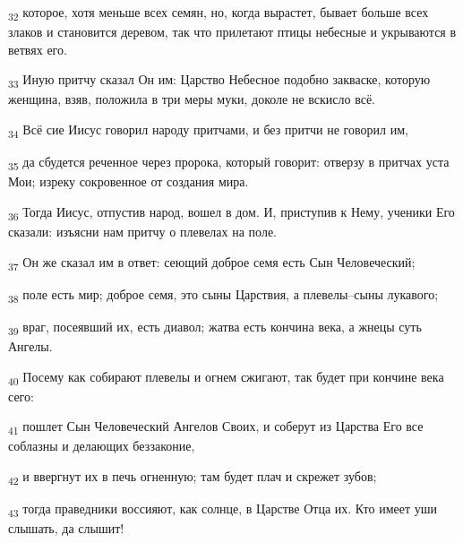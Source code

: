 \begin{tcolorbox}
\textsubscript{32} которое, хотя меньше всех семян, но, когда вырастет, бывает больше всех злаков и становится деревом, так что прилетают птицы небесные и укрываются в ветвях его.
\end{tcolorbox}
\begin{tcolorbox}
\textsubscript{33} Иную притчу сказал Он им: Царство Небесное подобно закваске, которую женщина, взяв, положила в три меры муки, доколе не вскисло всё.
\end{tcolorbox}
\begin{tcolorbox}
\textsubscript{34} Всё сие Иисус говорил народу притчами, и без притчи не говорил им,
\end{tcolorbox}
\begin{tcolorbox}
\textsubscript{35} да сбудется реченное через пророка, который говорит: отверзу в притчах уста Мои; изреку сокровенное от создания мира.
\end{tcolorbox}
\begin{tcolorbox}
\textsubscript{36} Тогда Иисус, отпустив народ, вошел в дом. И, приступив к Нему, ученики Его сказали: изъясни нам притчу о плевелах на поле.
\end{tcolorbox}
\begin{tcolorbox}
\textsubscript{37} Он же сказал им в ответ: сеющий доброе семя есть Сын Человеческий;
\end{tcolorbox}
\begin{tcolorbox}
\textsubscript{38} поле есть мир; доброе семя, это сыны Царствия, а плевелы--сыны лукавого;
\end{tcolorbox}
\begin{tcolorbox}
\textsubscript{39} враг, посеявший их, есть диавол; жатва есть кончина века, а жнецы суть Ангелы.
\end{tcolorbox}
\begin{tcolorbox}
\textsubscript{40} Посему как собирают плевелы и огнем сжигают, так будет при кончине века сего:
\end{tcolorbox}
\begin{tcolorbox}
\textsubscript{41} пошлет Сын Человеческий Ангелов Своих, и соберут из Царства Его все соблазны и делающих беззаконие,
\end{tcolorbox}
\begin{tcolorbox}
\textsubscript{42} и ввергнут их в печь огненную; там будет плач и скрежет зубов;
\end{tcolorbox}
\begin{tcolorbox}
\textsubscript{43} тогда праведники воссияют, как солнце, в Царстве Отца их. Кто имеет уши слышать, да слышит!
\end{tcolorbox}
